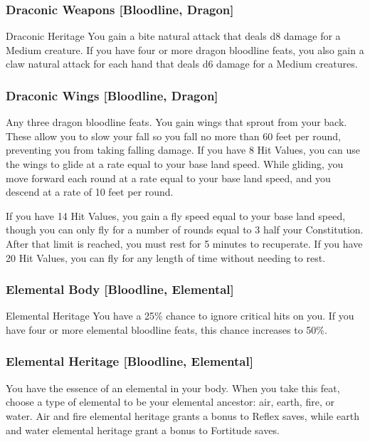 \subsubsection{Draconic Weapons [Bloodline, Dragon]}
 Draconic Heritage
 You gain a bite natural attack that deals d8 damage for a Medium creature. If you have four or more dragon bloodline feats, you also gain a claw natural attack for each hand that deals d6 damage for a Medium creatures.

\subsubsection{Draconic Wings [Bloodline, Dragon]}
 Any three dragon bloodline feats.
 You gain wings that sprout from your back. These allow you to slow your fall so you fall no more than 60 feet per round, preventing you from taking falling damage. If you have 8 Hit Values, you can use the wings to glide at a rate equal to your base land speed. While gliding, you move forward each round at a rate equal to your base land speed, and you descend at a rate of 10 feet per round.

If you have 14 Hit Values, you gain a fly speed equal to your base land speed, though you can only fly for a number of rounds equal to 3 \add half your Constitution. After that limit is reached, you must rest for 5 minutes to recuperate. If you have 20 Hit Values, you can fly for any length of time without needing to rest.

\subsubsection{Elemental Body [Bloodline, Elemental]}
\featpre Elemental Heritage
\featben You have a 25\% chance to ignore critical hits on you. If you have four or more elemental bloodline feats, this chance increases to 50\%.

\subsubsection{Elemental Heritage [Bloodline, Elemental]}
\featben You have the essence of an elemental in your body. When you take this feat, choose a type of elemental to be your elemental ancestor: air, earth, fire, or water. Air and fire elemental heritage grants a  bonus to Reflex saves, while earth and water elemental heritage grant a  bonus to Fortitude saves.

